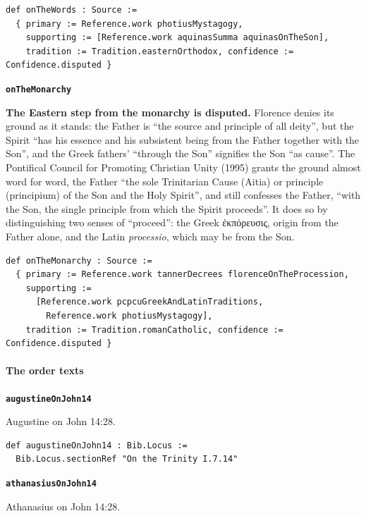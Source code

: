 \documentclass[11pt,paper=\testimonypaper,DIV=13,parskip=false]{scrartcl}
\begin{document}
{\small\begin{verbatim}
def onTheWords : Source :=
  { primary := Reference.work photiusMystagogy,
    supporting := [Reference.work aquinasSumma aquinasOnTheSon],
    tradition := Tradition.easternOrthodox, confidence := Confidence.disputed }
\end{verbatim}}
\par\medskip\noindent\textbf{\texttt{on\allowbreak{}The\allowbreak{}Monarchy}}\par\nobreak\noindent
\textbf{The Eastern step from the monarchy is disputed.} Florence denies its ground as it stands: the Father is “the source and principle of all deity”, but the Spirit “has his essence and his subsistent being from the Father together with the Son”, and the Greek fathers’ “through the Son” signifies the Son “as cause”. The Pontifical Council for Promoting Christian Unity (1995) grants the ground almost word for word, the Father “the sole Trinitarian Cause (Aitia) or principle (principium) of the Son and the Holy Spirit”, and still confesses the Father, “with the Son, the single principle from which the Spirit proceeds”. It does so by distinguishing two senses of “proceed”: the Greek ἐκπόρευσις, origin from the Father alone, and the Latin \emph{processio}, which may be from the Son.

{\small\begin{verbatim}
def onTheMonarchy : Source :=
  { primary := Reference.work tannerDecrees florenceOnTheProcession,
    supporting :=
      [Reference.work pcpcuGreekAndLatinTraditions,
        Reference.work photiusMystagogy],
    tradition := Tradition.romanCatholic, confidence := Confidence.disputed }
\end{verbatim}}
\paragraph*{The order texts}
\leavevmode\par\nobreak
\par\medskip\noindent\textbf{\texttt{augustine\allowbreak{}On\allowbreak{}John14}}\par\nobreak\noindent
Augustine on John 14:28.

{\small\begin{verbatim}
def augustineOnJohn14 : Bib.Locus :=
  Bib.Locus.sectionRef "On the Trinity I.7.14"
\end{verbatim}}
\par\medskip\noindent\textbf{\texttt{athanasius\allowbreak{}On\allowbreak{}John14}}\par\nobreak\noindent
Athanasius on John 14:28.
\end{document}
